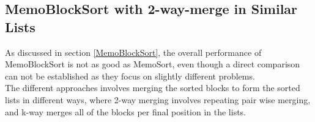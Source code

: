 \documentclass[a4paper,12pt]{article}
\begin{document}
\subsection{MemoBlockSort with 2-way-merge in Similar Lists}\label{MemoBlock2Res}

As discussed in section \ref{MemoBlockSort}, the overall performance of MemoBlockSort is not as good as MemoSort, even though a direct comparison can not be established as they focus on slightly different problems. \\

The different approaches involves merging the sorted blocks to form the sorted lists in different ways, where 2-way merging involves repeating pair wise merging, and k-way merges all of the blocks per final position in the lists. \\
\end{document}
